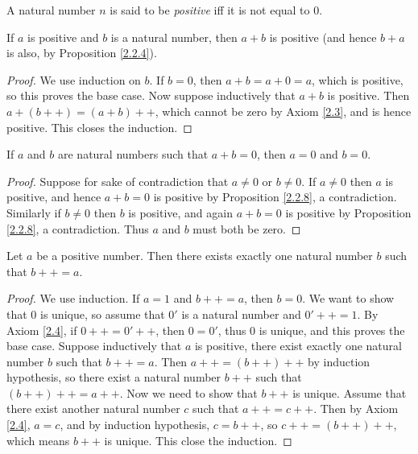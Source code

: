 \begin{definition}\label{2.2.7}
A natural number \(n\) is said to be \emph{positive} iff it is not equal to \(0\).
\end{definition}

\begin{proposition}\label{2.2.8}
If \(a\) is positive and \(b\) is a natural number, then \(a + b\) is positive (and hence \(b + a\) is also, by Proposition \ref{2.2.4}).
\end{proposition}

\begin{proof}
We use induction on \(b\).
If \(b = 0\), then \(a + b = a + 0 = a\), which is positive, so this proves the base case.
Now suppose inductively that \(a + b\) is positive.
Then \(a + (b++) = (a + b)++\), which cannot be zero by Axiom \ref{2.3}, and is hence positive.
This closes the induction.
\end{proof}

\begin{corollary}\label{2.2.9}
If \(a\) and \(b\) are natural numbers such that \(a + b = 0\), then \(a = 0\) and \(b = 0\).
\end{corollary}

\begin{proof}
Suppose for sake of contradiction that \(a \neq 0\) or \(b \neq 0\).
If \(a \neq 0\) then \(a\) is positive, and hence \(a + b = 0\) is positive by Proposition \ref{2.2.8}, a contradiction.
Similarly if \(b \neq 0\) then \(b\) is positive, and again \(a + b = 0\) is positive by Proposition \ref{2.2.8}, a contradiction.
Thus \(a\) and \(b\) must both be zero.
\end{proof}

\begin{lemma}\label{2.2.10}
Let \(a\) be a positive number.
Then there exists exactly one natural number \(b\) such that \(b++ = a\).
\end{lemma}

\begin{proof}
We use induction.
If \(a = 1\) and \(b++ = a\), then \(b = 0\).
We want to show that \(0\) is unique, so assume that \(0'\) is a natural number and \(0'++ = 1\).
By Axiom \ref{2.4}, if \(0++ = 0'++\), then \(0 = 0'\), thus \(0\) is unique, and this proves the base case.
Suppose inductively that \(a\) is positive, there exist exactly one natural number \(b\) such that \(b++ = a\).
Then \(a++ = (b++)++\) by induction hypothesis, so there exist a natural number \(b++\) such that \((b++)++ = a++\).
Now we need to show that \(b++\) is unique.
Assume that there exist another natural number \(c\) such that \(a++ = c++\).
Then by Axiom \ref{2.4}, \(a = c\), and by induction hypothesis, \(c = b++\), so \(c++ = (b++)++\), which means \(b++\) is unique.
This close the induction.
\end{proof}

